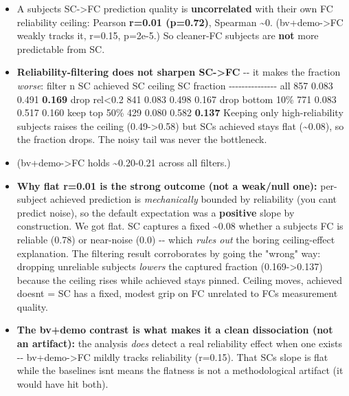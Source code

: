 \begin{itemize}
\tightlist
\item
  A subject\textquotesingle s SC-\textgreater FC prediction quality is \textbf{uncorrelated} with their own FC reliability ceiling: Pearson \textbf{r=0.01 (p=0.72)}, Spearman \textasciitilde0. (bv+demo-\textgreater FC weakly tracks it, r=0.15, p=2e-5.) So cleaner-FC subjects are \textbf{not} more predictable from SC.
\item
  \textbf{Reliability-filtering does not sharpen SC-\textgreater FC} -\/- it makes the fraction \emph{worse}: \textbar{} filter \textbar{} n \textbar{} SC achieved \textbar{} SC ceiling \textbar{} SC fraction \textbar{} \textbar-\/-\/-\textbar-\/-\/-\textbar-\/-\/-\textbar-\/-\/-\textbar-\/-\/-\textbar{} \textbar{} all \textbar{} 857 \textbar{} 0.083 \textbar{} 0.491 \textbar{} \textbf{0.169} \textbar{} \textbar{} drop rel\textless0.2 \textbar{} 841 \textbar{} 0.083 \textbar{} 0.498 \textbar{} 0.167 \textbar{} \textbar{} drop bottom 10\% \textbar{} 771 \textbar{} 0.083 \textbar{} 0.517 \textbar{} 0.160 \textbar{} \textbar{} keep top 50\% \textbar{} 429 \textbar{} 0.080 \textbar{} 0.582 \textbar{} \textbf{0.137} \textbar{} Keeping only high-reliability subjects raises the ceiling (0.49-\textgreater0.58) but SC\textquotesingle s achieved stays flat (\textasciitilde0.08), so the fraction drops. The noisy tail was never the bottleneck.
\item
  (bv+demo-\textgreater FC holds \textasciitilde0.20-0.21 across all filters.)
\item
  \textbf{Why flat r=0.01 is the strong outcome (not a weak/null one):} per-subject achieved prediction is \emph{mechanically} bounded by reliability (you can\textquotesingle t predict noise), so the default expectation was a \textbf{positive} slope by construction. We got flat. SC captures a fixed \textasciitilde0.08 whether a subject\textquotesingle s FC is reliable (0.78) or near-noise (0.0) -\/- which \emph{rules out} the boring ceiling-effect explanation. The filtering result corroborates by going the "wrong" way: dropping unreliable subjects \emph{lowers} the captured fraction (0.169-\textgreater0.137) because the ceiling rises while achieved stays pinned. Ceiling moves, achieved doesn\textquotesingle t = SC has a fixed, modest grip on FC unrelated to FC\textquotesingle s measurement quality.
\item
  \textbf{The bv+demo contrast is what makes it a clean dissociation (not an artifact):} the analysis \emph{does} detect a real reliability effect when one exists -\/- bv+demo-\textgreater FC mildly tracks reliability (r=0.15). That SC\textquotesingle s slope is flat while the baseline\textquotesingle s isn\textquotesingle t means the flatness is not a methodological artifact (it would have hit both).

\end{itemize}
